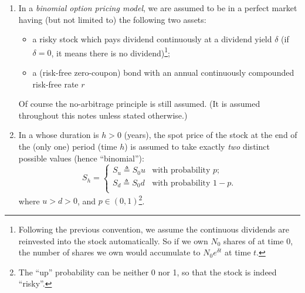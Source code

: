 \begin{enumerate}
\item In a \emph{binomial option pricing model}, we are assumed to be in a
perfect market having (but not limited to) the following two assets:
\begin{itemize}
\item a risky stock  which pays dividend continuously at a
dividend yield \(\delta\) (if \(\delta=0\), it means there is no
dividend)\footnote{Following the previous convention, we assume the continuous
dividends are reinvested into the stock  automatically. So if
we own \(N_0\) shares of  at time 0, the number of shares we
own would accumulate to \(N_0 e^{\delta t}\) at time \(t\).};

\item a (risk-free zero-coupon) bond  with an
annual continuously compounded risk-free rate \(r\)
\end{itemize}
\begin{note}
Of course the no-arbitrage principle is still assumed. (It is assumed
throughout this notes unless stated otherwise.)
\end{note}

\item In a  whose duration is
\(h>0\) (years), the spot price of the stock  at the end of
the (only one) period (time \(h\)) is assumed to take exactly \emph{two}
distinct possible values (hence
``binomial''):
\[
S_h=
\begin{cases}
\text{\(S_u\)}\triangleq S_0 u&\text{with probability \(p\)};\\
\text{\(S_d\)}\triangleq S_0 d&\text{with probability \(1-p\)}.\\
\end{cases}
\]
where \(u>d>0\), and \(p\in (0,1)\)\footnote{The ``up'' probability can be
neither 0 nor 1, so that the stock is indeed ``risky''.}.



\end{enumerate}
